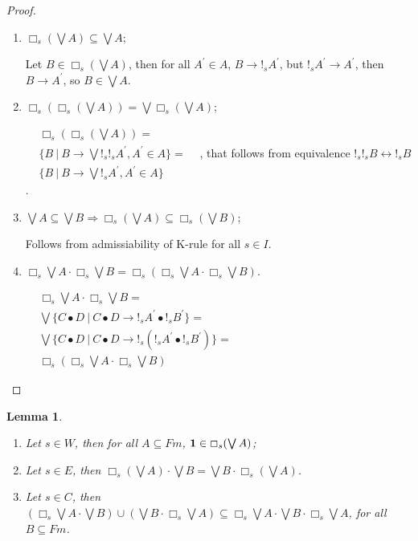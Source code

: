 \documentclass[a4paper]{article}
\newtheorem{lemma}{Lemma}
\begin{document}
\begin{proof}
$ $

\begin{enumerate}
  \item $\Box_s (\bigvee A) \subseteq \bigvee A$;

Let $B \in \Box_s (\bigvee A)$, then for all $A^{'} \in A$, $B \rightarrow !_s A^{'}$,
but $!_s A^{'} \rightarrow A^{'}$, then $B \rightarrow A^{'}$, so $B \in \bigvee A$.

\item $\Box_s (\Box_s(\bigvee A)) = \bigvee \Box_s (\bigvee A)$;

$\begin{array}{lll}
& \Box_s (\Box_s(\bigvee A)) = & \\
& \{ B \: | \: B \rightarrow \bigvee !_s !_s A^{'}, A^{'} \in A \} = & \\
& \{ B \: | \: B \rightarrow \bigvee !_s A^{'}, A^{'} \in A \} &
\end{array}$,
that follows from equivalence $!_s !_s B \leftrightarrow !_s B$.

\item $\bigvee A \subseteq \bigvee B \Rightarrow \Box_s (\bigvee A) \subseteq \Box_s (\bigvee B)$;

Follows from admissiability of K-rule for all $s \in I$.

\item $\Box_s \bigvee A \cdot \Box_s \bigvee B = \Box_s (\Box_s \bigvee A \cdot \Box_s \bigvee B)$.

$\begin{array}{lll}
&\Box_s \bigvee A \cdot \Box_s \bigvee B = & \\
&\bigvee \{ C \bullet D \: | \: C \bullet D \rightarrow !_s A^{'} \bullet !_s B^{'} \} = & \\
&\bigvee \{ C \bullet D \: | \: C \bullet D \rightarrow !_s (!_s A^{'} \bullet !_s B^{'})\} = & \\
&\Box_s (\Box_s \bigvee A \cdot \Box_s \bigvee B)&
\end{array}$

\end{enumerate}
\end{proof}

\begin{lemma}
$ $

  \begin{enumerate}
    \item Let $s \in W$, then for all $A \subseteq Fm$, ${\bf 1} \in \Box_s (\bigvee A)$;
    \item Let $s \in E$, then $\Box_s (\bigvee A) \cdot \bigvee B = \bigvee B \cdot \Box_s (\bigvee A)$.
    \item Let $s \in C$, then $(\Box_s \bigvee A \cdot \bigvee B) \cup (\bigvee B \cdot \Box_s \bigvee A) \subseteq \Box_s \bigvee A \cdot \bigvee B \cdot \Box_s \bigvee A$, for all $B \subseteq Fm$.
  \end{enumerate}
\end{lemma}
\end{document}
